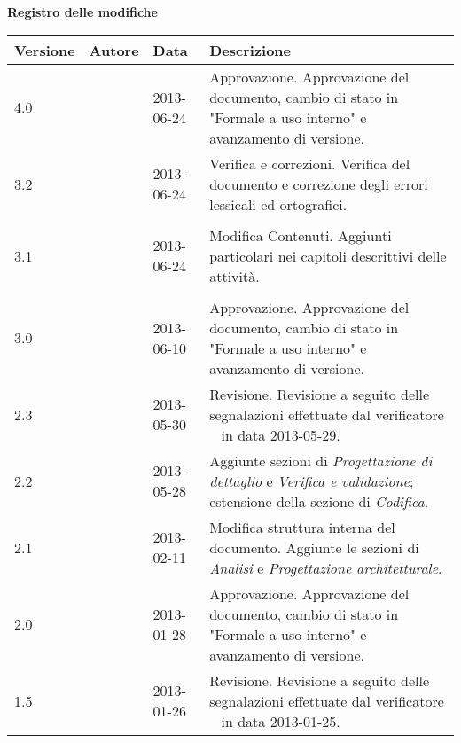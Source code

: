 \Large{\textbf{Registro delle modifiche}}\\
\normalsize

\label{tabVers}
\begin{longtable}{p{} p{} p{} p{}} 

\toprule
\textbf{Versione}	&	\textbf{Autore}	&	\textbf{Data}	&	\textbf{Descrizione}\\
\midrule
4.0	&	\MB &	2013-06-24	&	Approvazione.\newline
						Approvazione del documento, cambio di stato in "Formale a uso interno" e avanzamento di versione.
\\
\midrule
3.2	&	\SL &	2013-06-24	&	Verifica e correzioni.\newline
						Verifica del documento e correzione degli errori lessicali ed ortografici.\\
\\
\midrule
3.1	&	\EZ &	2013-06-24	&	Modifica Contenuti.\newline
								Aggiunti particolari nei capitoli descrittivi delle attività.\\
\\
\midrule
3.0	&	\FZ &	2013-06-10	&	Approvazione.\newline
						Approvazione del documento, cambio di stato in "Formale a uso interno" e avanzamento di versione.
\\
\midrule
2.3	&	\SL &	2013-05-30	&	Revisione.\newline
						Revisione a seguito delle segnalazioni effettuate dal verificatore \EZ~ in data 2013-05-29.
\\
\midrule
2.2	&	\SL &	2013-05-28	&	Aggiunte sezioni di \emph{Progettazione di dettaglio} e \emph{Verifica e validazione}; estensione della sezione di \emph{Codifica}.
\\
\midrule
2.1	&	\SL &	2013-02-11	&	Modifica struttura interna del documento.\newline
Aggiunte le sezioni di \emph{Analisi} e \emph{Progettazione architetturale}.
\\
\midrule
2.0	&	\DC &	2013-01-28	&	Approvazione.\newline
						Approvazione del documento, cambio di stato in "Formale a uso interno" e avanzamento di versione.\\
\midrule
1.5	&	\MB &	2013-01-26	&	Revisione.\newline
						Revisione a seguito delle segnalazioni effettuate dal verificatore \SL~ in data 2013-01-25.\\

\end{longtable}
